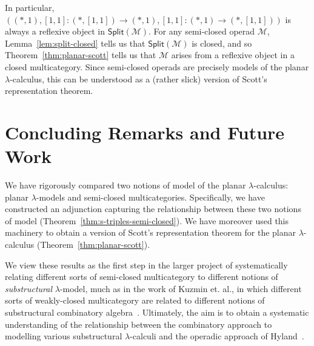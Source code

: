 \documentclass{llncs}
\begin{document}
In particular, $((*,1),[1,1] : (*,[1,1]) \to (*,1), [1,1] : (*,1) \to (*,[1,1]))$ is always a reflexive object in $\mathsf{Split}(\mathcal{M})$. For any semi-closed operad $\mathcal{M}$, Lemma~\ref{lem:split-closed} tells us that $\mathsf{Split}(\mathcal{M})$ is closed, and so Theorem~\ref{thm:planar-scott} tells us that $\mathcal{M}$ arises from a reflexive object in a closed multicategory. Since semi-closed operads are precisely models of the planar $\lambda$-calculus, this can be understood as a (rather slick) version of Scott's representation theorem.

\section{Concluding Remarks and Future Work}\label{sec:conclusion}
We have rigorously compared two notions of model of the planar $\lambda$-calculus: planar $\lambda$-models and semi-closed multicategories. Specifically, we have constructed an adjunction capturing the relationship between these two notions of model (Theorem~\ref{thm:s-triples-semi-closed}). We have moreover used this machinery to obtain a version of Scott's representation theorem for the planar $\lambda$-calculus (Theorem~\ref{thm:planar-scott}).

We view these results as the first step in the larger project of systematically relating different sorts of semi-closed multicategory to different notions of \emph{substructural} $\lambda$-model, much as in the work of Kuzmin et. al., in which different sorts of weakly-closed multicategory are related to different notions of substructural combinatory algebra~\cite{Kuzmin2026Journal}. Ultimately, the aim is to obtain a systematic understanding of the relationship between the combinatory approach to modelling various substructural $\lambda$-calculi and the operadic approach of Hyland~\cite{Hyland2017}.



\end{document}
